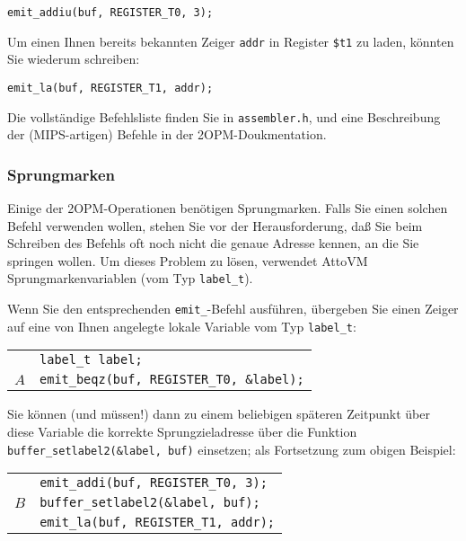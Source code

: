 \documentclass[11pt,a4paper]{article}
\newcommand{\Cty}[1]{\textcolor{dblue}{\texttt{#1}}}
\begin{document}
\texttt{emit\_addiu(buf, REGISTER\_T0, 3);}

Um einen Ihnen bereits bekannten Zeiger \texttt{addr} in Register \texttt{\$t1} zu laden, könnten Sie wiederum schreiben:

\texttt{emit\_la(buf, REGISTER\_T1, addr);}

Die vollständige Befehlsliste finden Sie in \texttt{assembler.h}, und eine Beschreibung der (MIPS-artigen) Befehle in der 2OPM-Doukmentation.

\subsubsection{Sprungmarken}

Einige der 2OPM-Operationen benötigen Sprungmarken.  Falls Sie einen solchen Befehl verwenden wollen,
stehen Sie vor der Herausforderung, daß Sie beim Schreiben des Befehls oft noch nicht die genaue Adresse kennen, an die Sie springen wollen.
Um dieses Problem zu lösen, verwendet AttoVM Sprungmarkenvariablen (vom Typ \Cty{label\_t}).


Wenn Sie den entsprechenden \texttt{emit\_}-Befehl ausführen, übergeben Sie einen Zeiger auf eine von Ihnen angelegte lokale
Variable vom Typ \Cty{label\_t}:


\vspace{0.5cm}
\begin{tabular}{ll}
&\texttt{\Cty{label\_t} label;}\\
$A$&\texttt{emit\_beqz(buf, REGISTER\_T0, \&label);}\\
\end{tabular}
\vspace{0.5cm}

Sie können (und müssen!) dann zu einem beliebigen späteren Zeitpunkt
über diese Variable die korrekte Sprungzieladresse über die Funktion \texttt{buffer\_setlabel2(\&label, buf)} einsetzen; als
Fortsetzung zum obigen Beispiel:

\vspace{0.5cm}

\begin{tabular}{ll}
&\texttt{emit\_addi(buf, REGISTER\_T0, 3);} \\
$B$&\texttt{buffer\_setlabel2(\&label, buf);} \\
&\texttt{emit\_la(buf, REGISTER\_T1, addr);} \\
\end{tabular}
\end{document}
